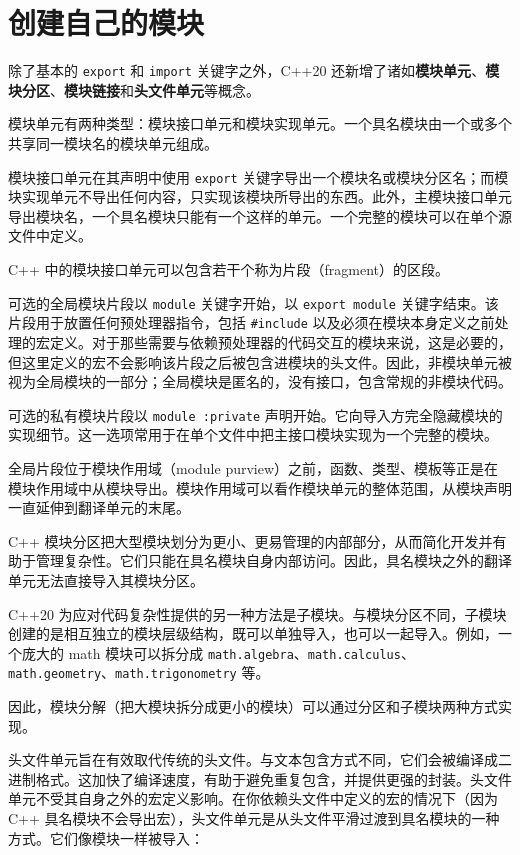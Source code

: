 \section{创建自己的模块}

\label{idx:752}
除了基本的 \texttt{export} 和 \texttt{import} 关键字之外，C++20 还新增了诸如\textbf{模块单元}、\textbf{模块分区}、\textbf{模块链接}和\textbf{头文件单元}等概念。

\label{idx:753}
\label{idx:754}
\label{idx:755}
\label{idx:756}
模块单元有两种类型：模块接口单元和模块实现单元。一个具名模块由一个或多个共享同一模块名的模块单元组成。

模块接口单元在其声明中使用 \texttt{export} 关键字导出一个模块名或模块分区名；而模块实现单元不导出任何内容，只实现该模块所导出的东西。此外，主模块接口单元导出模块名，一个具名模块只能有一个这样的单元。一个完整的模块可以在单个源文件中定义。

\label{idx:757}
C++ 中的模块接口单元可以包含若干个称为片段（fragment）的区段。

可选的全局模块片段以 \texttt{module} 关键字开始，以 \texttt{export module} 关键字结束。该片段用于放置任何预处理器指令，包括 \texttt{\#include} 以及必须在模块本身定义之前处理的宏定义。对于那些需要与依赖预处理器的代码交互的模块来说，这是必要的，但这里定义的宏不会影响该片段之后被包含进模块的头文件。因此，非模块单元被视为全局模块的一部分；全局模块是匿名的，没有接口，包含常规的非模块代码。

可选的私有模块片段以 \texttt{module :private} 声明开始。它向导入方完全隐藏模块的实现细节。这一选项常用于在单个文件中把主接口模块实现为一个完整的模块。

全局片段位于模块作用域（module purview）之前，函数、类型、模板等正是在模块作用域中从模块导出。模块作用域可以看作模块单元的整体范围，从模块声明一直延伸到翻译单元的末尾。

C++ 模块分区把大型模块划分为更小、更易管理的内部部分，从而简化开发并有助于管理复杂性。它们只能在具名模块自身内部访问。因此，具名模块之外的翻译单元无法直接导入其模块分区。

C++20 为应对代码复杂性提供的另一种方法是子模块。与模块分区不同，子模块创建的是相互独立的模块层级结构，既可以单独导入，也可以一起导入。例如，一个庞大的 math 模块可以拆分成 \texttt{math.\allowbreak{}algebra}、\texttt{math.\allowbreak{}calculus}、\texttt{math.\allowbreak{}geometry}、\texttt{math.\allowbreak{}trigonometry} 等。

因此，模块分解（把大模块拆分成更小的模块）可以通过分区和子模块两种方式实现。

\label{idx:758}
头文件单元旨在有效取代传统的头文件。与文本包含方式不同，它们会被编译成二进制格式。这加快了编译速度，有助于避免重复包含，并提供更强的封装。头文件单元不受其自身之外的宏定义影响。在你依赖头文件中定义的宏的情况下（因为 C++ 具名模块不会导出宏），头文件单元是从头文件平滑过渡到具名模块的一种方式。它们像模块一样被导入：

